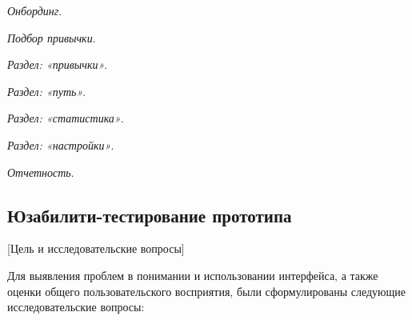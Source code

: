 \documentclass[pdflatex,sn-mathphys-num]{sn-jnl}%
\theoremstyle{thmstyleone}%
\theoremstyle{thmstyletwo}%
\theoremstyle{thmstylethree}%
\begin{document}
\textit{Онбординг}.

\textit{Подбор привычки}.

\textit{Раздел: «привычки»}.

\textit{Раздел: «путь»}.

\textit{Раздел: «статистика»}.

\textit{Раздел: «настройки»}.

\textit{Отчетность}.

\subsection{Юзабилити-тестирование прототипа}
[Цель и исследовательские вопросы]

Для выявления проблем в понимании и использовании интерфейса, а также оценки общего пользовательского восприятия, были сформулированы следующие исследовательские вопросы:
\end{document}
